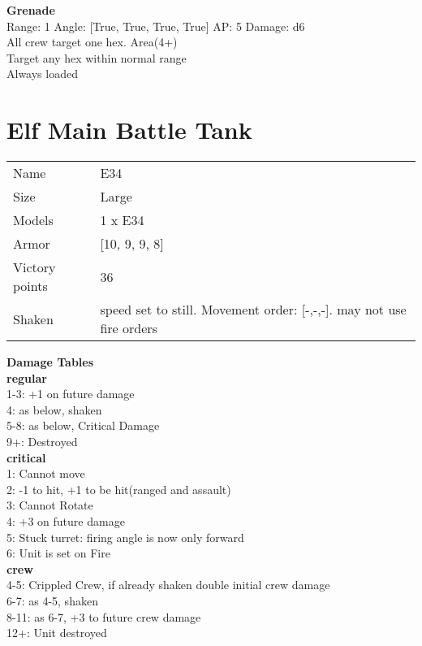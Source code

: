 {\bf Grenade } \\



Range: 1  Angle: [True, True, True, True] AP: 5 Damage: d6 \\
All crew target one hex. Area(4+)\\ 
Target any hex within normal range\\ 
Always loaded\\ 




 















\clearpage

\section{ Elf Main Battle Tank }

\begin{tabular}{ll}
  Name & E34 \\
  Size & Large\\
  Models & 1 x E34\\
  Armor & [10, 9, 9, 8]\\
  Victory points & 36\\
  Shaken & speed set to still. Movement order: [-,-,-]. may not use fire orders\\
\end{tabular}




{\bf Damage Tables} \\
 {\bf regular } \\
1-3: +1 on future damage \\
4: as below, shaken \\
5-8: as below, Critical Damage \\
9+: Destroyed \\
 {\bf critical } \\
1: Cannot move \\
2: -1 to hit, +1 to be hit(ranged and assault) \\
3: Cannot Rotate \\
4: +3 on future damage \\
5: Stuck turret: firing angle is now only forward \\
6: Unit is set on Fire \\
 {\bf crew } \\
4-5: Crippled Crew, if already shaken double initial crew damage \\
6-7: as 4-5, shaken \\
8-11: as 6-7, +3 to future crew damage \\
12+: Unit destroyed \\


